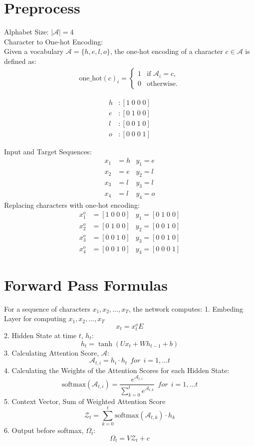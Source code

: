 \documentclass{article}
\begin{document}
\section{Preprocess}
Alphabet Size: $|\mathcal{A}| = 4$  \\
Character to One-hot Encoding: \\
Given a vocabulary $\mathcal{A} = \{h, e, l, o\}$, the one-hot encoding of a character $c \in \mathcal{A}$ is defined as:
\begin{align*}
\text{one\_hot}(c)_i = 
\begin{cases} 
1 & \text{if } \mathcal{A}_i = c, \\
0 & \text{otherwise}.
\end{cases}
\end{align*}

\begin{align*}
    h & : [1\; 0\; 0\; 0] \\
    e & : [0\; 1\; 0\; 0] \\
    l & : [0\; 0\; 1\; 0] \\
    o & : [0\; 0\; 0\; 1]
\end{align*}

Input and Target Sequences:
\begin{align*}
    x_1 & = h  &y_1 = e \\
    x_2 & = e  &y_2 = l \\
    x_3& = l  &y_3 = l \\
    x_4 & = l  &y_4 = o
\end{align*}
Replacing characters with one-hot encoding:
\begin{align*}
    x^o_1 & = [1\; 0\; 0\; 0]  &y_1 = [0\; 1\; 0\; 0] \\
    x^o_2 & = [0\; 1\; 0\; 0]  &y_2 = [0\; 0\; 1\; 0] \\
    x^o_3& = [0\; 0\; 1\; 0]  &y_3 = [0\; 0\; 1\; 0] \\
    x^o_4 & = [0\; 0\; 1\; 0]  &y_4 = [0\; 0\; 0\; 1]
\end{align*}

\section{Forward Pass Formulas}

For a sequence of characters $x_1, x_2, \ldots, x_T$, the network computes:
1. Embeding Layer for computing $x_1, x_2, \ldots, x_T$ \\
$$
x_t = x^o_t E
$$
2. Hidden State at time $t$, $h_t$:
$$
h_t = \tanh(Ux_t + Wh_{t-1} + b)
$$
3. Calculating Attention Score, $\mathcal{A}$:
$$
\mathcal{A}_{t,i} = h_i  \cdot h_t~~for~~ i =1, \ldots t
$$
4. Calculating the Weights of the Attention Scores for each Hidden State:
$$\text{softmax}(\mathcal{A}_{t,i}) = \frac{e^{\mathcal{A}_{t,i }}}{\sum_{k=0}^{t} e^{\mathcal{A}_{t,k}}} ~~for~~ i =1, \ldots t$$
5. Context Vector, Sum of Weighted Attention Score
$$\mathcal{Z}_t = \sum_{k=0}^{t}  \text{softmax}(\mathcal{A}_{t,k}) \cdot h_k$$
6. Output before softmax, $\Omega_t$:
$$
\Omega_t = V\mathcal{Z}_t + c
$$
\end{document}

